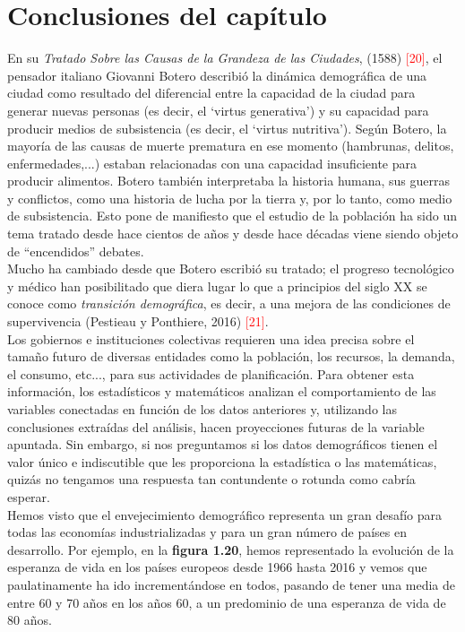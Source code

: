 \section{Conclusiones del capítulo}

En su \textit{Tratado Sobre las Causas de la Grandeza de las Ciudades}, (1588) \textcolor{red}{[20]}, el pensador italiano Giovanni Botero describió la dinámica demográfica de una ciudad como resultado del diferencial entre la capacidad de la ciudad para generar nuevas personas (es decir, el `virtus generativa') y su capacidad para producir medios de subsistencia (es decir, el `virtus nutritiva'). Según Botero, la mayoría de las causas de muerte prematura en ese momento (hambrunas, delitos, enfermedades,...) estaban relacionadas con una capacidad insuficiente para producir alimentos. Botero también interpretaba la historia humana, sus guerras y conflictos, como una historia de lucha por la tierra y, por lo tanto, como medio de subsistencia. Esto pone de manifiesto que el estudio de la población ha sido un tema tratado desde hace cientos de años y desde hace décadas viene siendo objeto de ``encendidos'' debates.\\

\vspace{-0.2cm}
Mucho ha cambiado desde que Botero escribió su tratado; el progreso tecnológico y médico han posibilitado que diera lugar lo que a principios del siglo XX se conoce como \textit{transición demográfica}, es decir, a una mejora de las condiciones de supervivencia (Pestieau y Ponthiere, 2016) \textcolor{red}{[21]}.\\

\vspace{-0.2cm}
Los gobiernos e instituciones colectivas requieren una idea precisa sobre el tamaño futuro de diversas entidades como la población, los recursos, la demanda, el consumo, etc..., para sus actividades de planificación. Para obtener esta información, los estadísticos y matemáticos analizan el comportamiento de las variables conectadas en función de los datos anteriores y, utilizando las conclusiones extraídas del análisis, hacen proyecciones futuras de la variable apuntada. Sin embargo, si nos preguntamos si los datos demográficos tienen el valor único e indiscutible que les proporciona la estadística o las matemáticas, quizás no tengamos una respuesta tan contundente o rotunda como cabría esperar.\\

\vspace{-0.2cm}
Hemos visto que el envejecimiento demográfico representa un gran desafío para todas las economías industrializadas y para un gran número de países en desarrollo. Por ejemplo, en la \textbf{figura 1.20}, hemos representado la evolución de la esperanza de vida en los países europeos desde 1966 hasta 2016 y vemos que paulatinamente ha ido incrementándose en todos, pasando de tener una media de entre 60 y 70 años en los años 60, a un predominio de una esperanza de vida de 80 años.

